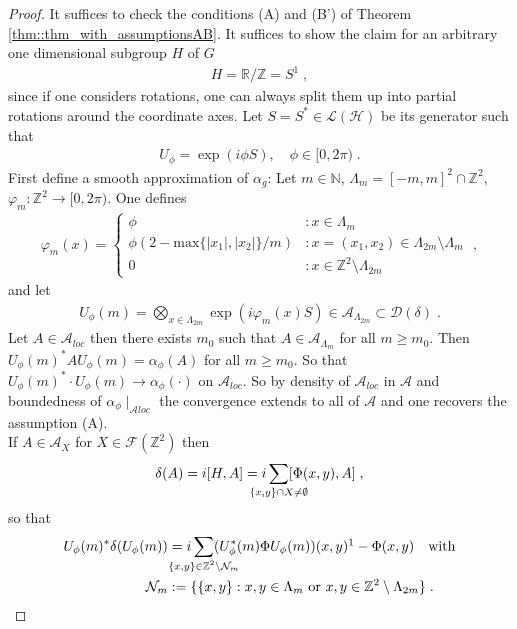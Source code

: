 \documentclass[
a4paper, %
11pt, %
onecolumn, %
openany, %
]{memoir}
\theoremstyle{definition}
\theoremstyle{remark}
\theoremstyle{plain}
\begin{document}
\begin{proof}
It suffices to check the conditions (A) and (B') of Theorem \ref{thm::thm_with_assumptionsAB}. It suffices to show the claim for an arbitrary one dimensional subgroup $H$ of $G$ \begin{align}
H=\mathbb{R}/\mathbb{Z}=S^1\; ,
\end{align} since if one considers rotations, one can always split them up into partial rotations around the coordinate axes. Let $S=S^*\in\mathcal{L}(\mathcal{H})$ be its generator such that\begin{align}
U_{\phi}=\exp(i\phi S),\quad \phi\in [0,2\pi)\; .
\end{align}
First define a smooth approximation of $\alpha_g$: Let $m\in\mathbb{N}$, $\Lambda_{m}=[-m,m]^2\cap\mathbb{Z}^2$, $\varphi_m:\mathbb{Z}^2\rightarrow[0,2\pi)$. One defines \begin{align}
\varphi_m(x)=\begin{cases}\phi & \colon x\in\Lambda_m \\
\phi(2-\mathrm{max}\{|x_1|,|x_2|\}/m)&\colon x=(x_1,x_2)\in\Lambda_{2m}\setminus\Lambda_m\\
0 & \colon x\in \mathbb{Z}^2\setminus\Lambda_{2m} \end{cases}\; ,\label{eqn::distance_dep_rotation}
\end{align}
and let \begin{align}
U_{\phi}(m)=\bigotimes_{x\in\Lambda_{2m}}\exp(i\varphi_m(x)S)\in\mathcal{A}_{\Lambda_{2m}}\subset\mathcal{D}(\delta)\; .\label{eqn::def_U_matrix}
\end{align}
Let $A\in\mathcal{A}_{loc}$ then there exists $m_0$ such that $A\in\mathcal{A}_{\Lambda_m}$ for all $m\geq m_0$. Then $U_{\phi}(m)^*AU_{\phi}(m)=\alpha_{\phi}(A)$ for all $m\geq m_0$. So that $U_{\phi}(m)^*\cdot U_{\phi}(m)\rightarrow\alpha_{\phi}(\cdot)$ on $\mathcal{A}_{loc}$. So by density of $\mathcal{A}_{loc}$ in $\mathcal{A}$ and boundedness of $\alpha_{\phi}\mid_{\mathcal{A}{loc}}$ the convergence extends to all of $\mathcal{A}$ and one recovers the assumption (A).\\
If $A\in\mathcal{A}_X$ for $X\in\mathcal{F}(\mathbb{Z}^2)$ then \begin{align}
\delta(A)=i[H,A]=i\sum_{\mathclap{\{x,y\}\cap X\neq \emptyset}}[\Phi(x,y),A]\; ,
\end{align}
so that 
\begin{align} 
U_{\phi}(m)^*\delta(U_{\phi}(m))&=i\sum_{\mathclap{\{x,y\}\in\mathbb{Z}^2\setminus \mathcal{N}_{m}}} (U_{\phi}^*(m)\Phi U_{\phi}(m))(x,y)\footnotemark-\Phi(x,y)\quad \text{with}\\\mathcal{N}_m &:=\{\{x,y\}: x,y\in\Lambda_m \text{ or } x,y\in\mathbb{Z}^2\setminus\Lambda_{2m}\} \;.

\end{align}
\end{proof}
\end{document}
